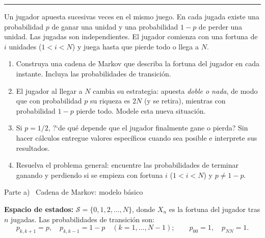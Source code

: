 \documentclass[10pt,a4paper]{article}
\newcommand{\parteheader}[1]{%
  \vspace{8pt}\needspace{4cm}\noindent
  \begin{tcolorbox}[
    colback=subsecbg!18, colframe=subsecbg!55,
    sharp corners, boxrule=0.4pt,
    left=6pt, right=6pt, top=3pt, bottom=3pt,
    fontupper=\small\bfseries\sffamily,
  ]
  #1
  \end{tcolorbox}\vspace{2pt}%
}
\newenvironment{enunciado}[1]{%
  \begin{tcolorbox}[
    breakable,
    colback=sectionbg!8, colframe=sectionbg,
    boxrule=0.8pt, arc=3pt, left=8pt, right=8pt, top=6pt, bottom=6pt,
    fonttitle=\normalsize\bfseries\sffamily, coltitle=white, colbacktitle=sectionbg, titlerule=0pt,
    title={#1},
  ]%
}{\end{tcolorbox}}
\begin{document}
\vspace{10pt}
{\color{subsecbg!60}\hrule}
\vspace{6pt}

\begin{enunciado}{Problema 2 \textperiodcentered\ Ruina del jugador}
  Un jugador apuesta sucesivas veces en el mismo juego. En cada jugada existe una
  probabilidad $p$ de ganar una unidad y una probabilidad $1-p$ de perder una unidad.
  Las jugadas son independientes. El jugador comienza con una fortuna de $i$ unidades
  ($1<i<N$) y juega hasta que pierde todo o llega a $N$.

  \smallskip
  \begin{enumerate}[label=\alph*)]
    \item Construya una cadena de Markov que describa la fortuna del jugador en cada
          instante. Incluya las probabilidades de transici\'on.
    \item El jugador al llegar a $N$ cambia su estrategia: apuesta \emph{doble o
            nada}, de modo que con probabilidad $p$ su riqueza es $2N$ (y se retira),
          mientras con probabilidad $1-p$ pierde todo. Modele esta nueva situaci\'on.
    \item Si $p=1/2$, ?`de qu\'e depende que el jugador finalmente gane o pierda?
          Sin hacer c\'alculos entregue valores espec\'ificos cuando sea posible e
          interprete sus resultados.
    \item Resuelva el problema general: encuentre las probabilidades de terminar
          ganando y perdiendo si se empieza con fortuna $i$ ($1<i<N$) y
          $p\ne 1-p$.
  \end{enumerate}
\end{enunciado}

\vspace{6pt}

\parteheader{Parte a) \textperiodcentered\ Cadena de Markov: modelo b\'asico}

\textbf{Espacio de estados:} $\mathcal{S}=\{0,1,2,\ldots,N\}$, donde $X_n$ es la
fortuna del jugador tras $n$ jugadas. Las probabilidades de transici\'on son:
\[
  p_{k,k+1}=p, \quad p_{k,k-1}=1-p \quad (k=1,\ldots,N-1); \qquad
  p_{00}=1, \quad p_{NN}=1.
\]
\end{document}
